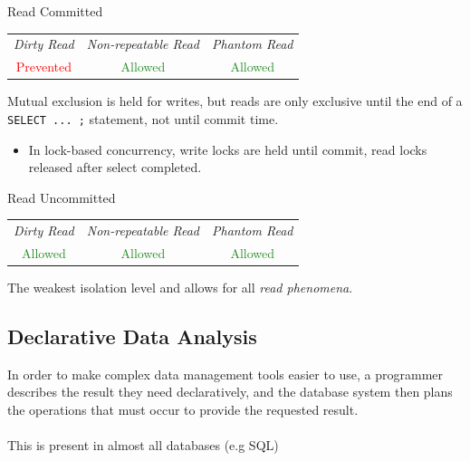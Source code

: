 \begin{definitionbox}{Read Committed}
    \begin{center}
        \begin{tabular}{c | c | c}
            \textit{Dirty Read} & \textit{Non-repeatable Read} & \textit{{Phantom Read}} \\
            \textcolor{red}{Prevented} & \textcolor{ForestGreen}{Allowed} & \textcolor{ForestGreen}{Allowed} \\
        \end{tabular}
    \end{center}
    Mutual exclusion is held for writes, but reads are only exclusive until the end of a \texttt{SELECT ... ;} statement, not until commit time.
    \begin{itemize}
        \item In lock-based concurrency, write locks are held until commit, read locks released after select completed.
    \end{itemize}
\end{definitionbox}
\begin{definitionbox}{Read Uncommitted}
    \begin{center}
        \begin{tabular}{c | c | c}
            \textit{Dirty Read} & \textit{Non-repeatable Read} & \textit{{Phantom Read}} \\
            \textcolor{ForestGreen}{Allowed} & \textcolor{ForestGreen}{Allowed} & \textcolor{ForestGreen}{Allowed} \\
        \end{tabular}
    \end{center}
    The weakest isolation level and allows for all \textit{read phenomena}.
\end{definitionbox}

\subsection{Declarative Data Analysis}
In order to make complex data management tools easier to use, a programmer describes the result 
they need declaratively, and the database system then plans the operations that must occur to 
provide the requested result.
\\
\\ This is present in almost all databases (e.g SQL)

